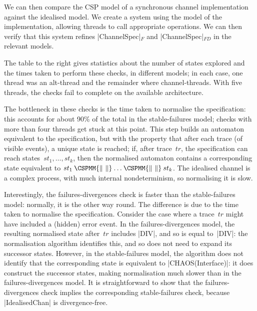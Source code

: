 
We can then compare the CSP model of a synchronous channel implementation
against the idealised model.  We create a system using the model of the
implementation, allowing threads to call appropriate operations.  We can then
verify that this system refines |ChannelSpec|$_F$ and |ChannelSpec|$_{FD}$ in
the relevant models.

\begin{window}
%
The table to the right gives statistics about the number of states explored
and the times taken to perform these checks, in different models; in each
case, one thread was an alt-thread and the remainder where channel-threads.
With five threads, the checks fail to complete on the available architecture.
\end{window}

The bottleneck in these checks is the time taken to normalise the
specification: this accounts for about 90\% of the total in the
stable-failures model; checks with more than four threads get stuck at this
point.  This step builds an automaton equivalent to the specification, but
with the property that after each trace (of visible events), a unique state is
reached; if, after trace~$tr$, the specification can reach
states~$st_1,\ldots,st_k$, then the normalised automaton contains a
corresponding state equivalent to $st_1 \mathbin{\CSPMM{\|~\|}} \ldots
\mathbin{\CSPMM{\|~\|}} st_k$.  The idealised channel is a complex process,
with much internal nondeterminism, so normalising it is slow.

Interestingly, the failures-divergences check is faster than the
stable-failures model: normally, it is the other way round.  The difference is
due to the time taken to normalise the specification.
Consider the case where a trace~$tr$ might have included a (hidden) error
event.  In the failures-divergences model, the resulting normalised state
after~$tr$ includes |DIV|, and so is equal to~|DIV|: the normalisation
algorithm identifies this, and so does not need to expand its successor
states.  However, in the stable-failures model, the algorithm does not
identify that the corresponding state is equivalent to |CHAOS(Interface)|: it
does construct the successor states, making normalisation much slower than in
the failures-divergences model.  It is straightforward to show that the
failures-divergences check implies the corresponding stable-failures check,
because |IdealisedChan| is divergence-free.


